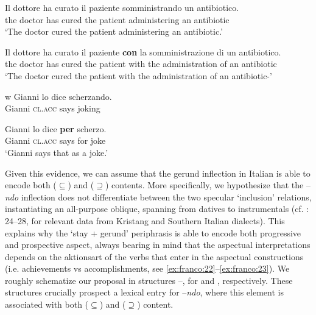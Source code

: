 \documentclass[output=paper,modfonts,nonflat,newtxmath,colorlinks,citecolor=brown]{langsci/langscibook}
\begin{document}
\ea%
    \label{ex:franco:28}
    \ea \label{ex:franco:28a}
    \gll  Il dottore ha curato il paziente somministrando un antibiotico.\\
        the doctor has cured the patient administering an antibiotic\\
    \glt ‘The doctor cured the patient administering an antibiotic.’
    
     \ex \label{ex:franco:28b}
    \gll Il dottore ha curato il paziente \textbf{con} la somministrazione di un antibiotico.\\
        the doctor has cured the patient with the administration of an antibiotic\\
    \glt ‘The doctor cured the patient with the administration of an antibiotic-’
    \z
    \z


w
\ea%
\label{ex:franco:29}
    \ea \label{ex:franco:29a}
    \gll  Gianni lo dice scherzando.\\
        Gianni \textsc{cl.acc} says joking\\
    \glt
    
     \ex \label{ex:franco:29b}
    \gll  Gianni lo dice \textbf{per} scherzo.\\
        Gianni \textsc{cl.acc} says for joke\\
    \glt `Gianni says that as a joke.'
    \z
    \z 

Given this evidence, we can assume that the gerund inflection in Italian is able to encode both (${\subseteq}$) and (${\supseteq}$) contents. More specifically, we hypothesize that the –\textit{ndo} inflection does not differentiate between the two specular ‘inclusion’ relations, instantiating an all-purpose oblique, spanning from datives to instrumentals (cf. \citealt{FrancoManzini2017}: 24--28, for relevant data from Kristang and Southern Italian dialects). This explains why the ‘stay + gerund’ periphrasis is able to encode both progressive and prospective aspect, always bearing in mind that the aspectual interpretations depends on the {aktionsart} of the verbs that enter in the aspectual constructions (i.e. achievements vs accomplishments, see \ref{ex:franco:22}--\ref{ex:franco:23}). We roughly schematize our proposal in structures –, for  and , respectively. These structures crucially prospect a lexical entry for –\textit{ndo}, where this element is associated with both (${\subseteq}$) and (${\supseteq}$) content.

\ea%
    \label{ex:franco:30}
    
\end{document}
